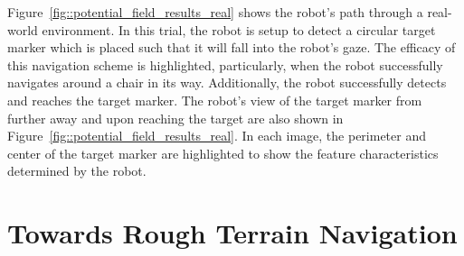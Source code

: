 			Figure~\ref{fig::potential_field_results_real} shows the robot's path through a real-world environment. In this trial, the robot is setup to detect a circular target marker which is placed such that it will fall into the robot's gaze. The efficacy of this navigation scheme is highlighted, particularly, when the robot successfully navigates around a chair in its way. Additionally, the robot successfully detects and reaches the target marker. The robot's view of the target marker from further away and upon reaching the target are also shown in Figure~\ref{fig::potential_field_results_real}. In each image, the perimeter and center of the target marker are highlighted to show the feature characteristics determined by the robot.






	\section{Towards Rough Terrain Navigation}

